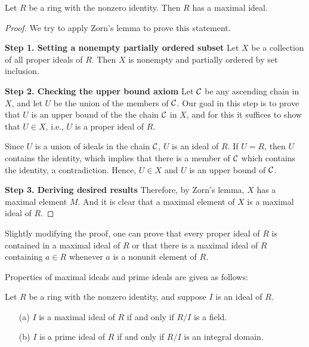 \begin{prop}
    Let $R$ be a ring with the nonzero identity.
    Then $R$ has a maximal ideal.
\end{prop}
\begin{proof}
    We try to apply Zorn's lemma to prove this statement.
    
    \textbf{Step 1. Setting a nonempty partially ordered subset}\newline
    Let $X$ be a collection of all proper ideals of $R$.
    Then $X$ is nonempty and partially ordered by set inclusion.

    \textbf{Step 2. Checking the upper bound axiom}\newline
    Let ${\mathcal{C}}$ be any ascending chain in $X$, and let $U$ be the union of the members of ${\mathcal{C}}$.
    Our goal in this step is to prove that $U$ is an upper bound of the the chain ${\mathcal{C}}$ in $X$, and for this it suffices to show that $U\in X$, i.e., $U$ is a proper ideal of $R$.

    Since $U$ is a union of ideals in the chain ${\mathcal{C}}$, $U$ is an ideal of $R$.
    If $U=R$, then $U$ contains the identity, which implies that there is a member of ${\mathcal{C}}$ which contains the identity, a contradiction.
    Hence, $U\in X$ and $U$ is an upper bound of ${\mathcal{C}}$.

    \textbf{Step 3. Deriving desired results}\newline
    Therefore, by Zorn's lemma, $X$ has a maximal element $M$.
    And it is clear that a maximal element of $X$ is a maximal ideal of $R$.
\end{proof}
\begin{rmk}
    Slightly modifying the proof, one can prove that every proper ideal of $R$ is contained in a maximal ideal of $R$ or that there is a maximal ideal of $R$ containing $a\in R$ whenever $a$ is a nonunit element of $R$.
\end{rmk}

Properties of maximal ideals and prime ideals are given as follows:
\begin{prop}
    Let $R$ be a ring with the nonzero identity, and suppose $I$ is an ideal of $R$.
    \begin{enumerate}
        \item[(a)]
        {
            $I$ is a maximal ideal of $R$ if and only if $R/I$ is a field.
        }
        \item[(b)]
        {
            $I$ is a prime ideal of $R$ if and only if $R/I$ is an integral domain.
        }
    \end{enumerate}
\end{prop}